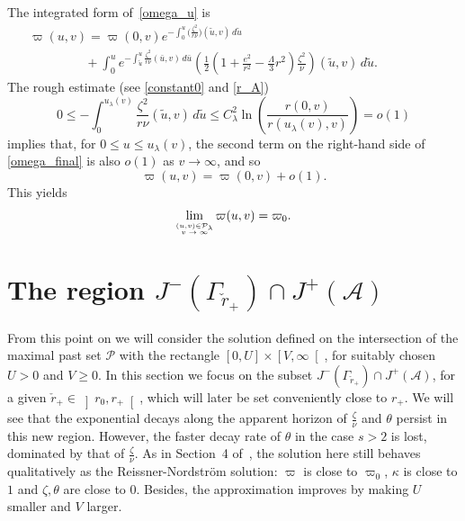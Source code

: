 \documentclass[a4paper,11pt,oneside,reqno]{amsart}
\newcommand{\s}{s}
\newcommand{\cal}{\mathcal}
\newcommand{\ckrp}{\check r_+}
\begin{document}
The integrated form of~\eqref{omega_u} is
\begin{eqnarray} 
\varpi(u,v)=\varpi(0,v)e^{-\int_0^u\bigl(\frac{\zeta^2}{r\nu}\bigr)(\tilde u,v)\,d\tilde u}\qquad\qquad\qquad\qquad\qquad\qquad\qquad&&\nonumber\\ \qquad\qquad\ \  +
\int_0^ue^{-\int_{\tilde u}^u\frac{\zeta^2}{r\nu}(\bar u,v)\,d\bar u}\left(\frac{1}{2}\left(1+\frac{e^2}{r^2}
-\frac{\Lambda}{3}r^2\right)\frac{\zeta^2}{\nu}\right)(\tilde u,v)\,d\tilde u.&&\label{omega_final}
\end{eqnarray}
The rough estimate (see \eqref{constant0} and \eqref{r_A})
$$
0\leq -\int_0^{u_\lambda(v)}\frac{\zeta^2}{r\nu}(\tilde u,v)\,d\tilde u\leq
C_\lambda^2\ln\left(\frac{r(0,v)}{r(u_\lambda(v),v)}\right) = o(1)
$$
implies that,
for $0\leq u\leq u_\lambda(v)$, the second term on the right-hand side of \eqref{omega_final} is also $o(1)$ as $v \to \infty$, and so
\begin{equation}\label{o1}
\varpi(u,v)=\varpi(0,v)+o(1).
\end{equation}
This yields
\begin{equation}\label{zero}
\lim_{\stackrel{(u,v)\in{\cal P}_\lambda}{{\mbox{\tiny{$v\to\infty$}}}}}\varpi(u,v)=\varpi_0.
\end{equation}

\section{The region $J^-(\Gamma_{\ckrp})\cap J^+({\cal A})$}\label{section5}

From this point on we will consider the solution defined on the intersection of the maximal past set $\cal P$ with the rectangle $\left[0,U\right]\times\left[V,\infty\right[$, for suitably chosen $U>0$ and $V\geq 0$.
In this section we focus on the subset $J^-(\Gamma_{\ckrp})\cap J^+({\cal A})$, for a given ${\ckrp} \in \left]r_0,r_+\right[$, which will later be set conveniently close to $r_+$. We will see that the exponential decays along the apparent horizon of $\frac{\zeta}{\nu}$ and $\theta$ persist in this new region. However, the faster decay rate of $\theta$ in the case $\s>2$ is lost, dominated by that of $\frac{\zeta}{\nu}$. As in Section~4 of~\cite{relIst2}, the solution here still behaves qualitatively as the Reissner-Nordstr\"om solution: $\varpi$ is close to $\varpi_0$, $\kappa$ is close to $1$ and $\zeta, \theta$ are close to $0$. Besides, the approximation improves by making $U$ smaller and $V$ larger.
\end{document}
